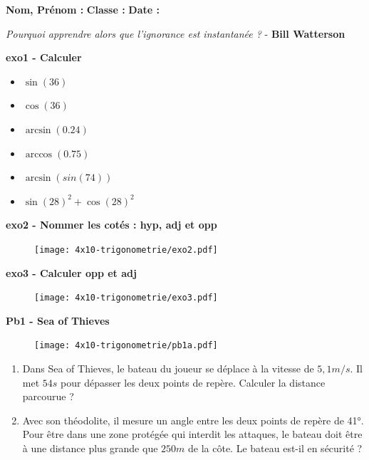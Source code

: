 \Pointilles[29]

\newpage

\textbf{Nom, Prénom :} \hspace{8cm} \textbf{Classe :} \hspace{3cm} \textbf{Date :}\\

\vspace{-0.5cm} \begin{center}
  \textit{Pourquoi apprendre alors que l’ignorance est instantanée ?}  - \textbf{ Bill Watterson}
\end{center}

\textbf{exo1 - Calculer}

\begin{multicols}{3}
\begin{itemize}[label={$\bullet$}]
  \item $\sin(36)$ \dotfill 
  \item $\cos(36)$ \dotfill \columnbreak
  \item $\arcsin(0.24)$ \dotfill 
  \item $\arccos(0.75)$ \dotfill \columnbreak
  \  \item $\arcsin(sin(74))$ \dotfill 
  \item $\sin(28)^2 + \cos(28)^2 $ \dotfill 
\end{itemize} 
\end{multicols}

\textbf{exo2 - Nommer les cotés : hyp, adj et opp}

\begin{figure}[H]
  \centering
  \texttt{[image: 4x10-trigonometrie/exo2.pdf]}
\end{figure}

\textbf{exo3 - Calculer opp et adj}

\begin{figure}[H]
  \centering
  \texttt{[image: 4x10-trigonometrie/exo3.pdf]}
\end{figure}

\Pointilles[3]

\begin{multicols}{2}

\textbf{Pb1 - Sea of Thieves}

\begin{figure}[H]
  \centering
  \texttt{[image: 4x10-trigonometrie/pb1a.pdf]}
\end{figure}

\begin{enumerate}
  \item Dans Sea of Thieves, le bateau du joueur se déplace à la vitesse de $5,1m/s$. Il met $54s$ pour dépasser les deux points de repère. Calculer la distance parcourue ?
  \item Avec son théodolite, il mesure un angle entre les deux points de repère de 41°. Pour être dans une zone protégée qui interdit les attaques, le bateau doit être à une distance plus grande que $250m$ de la côte. Le bateau est-il en sécurité ?
\end{enumerate} \columnbreak

\Pointilles[17]

\end{multicols}

